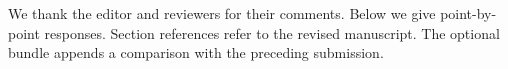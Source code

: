 We thank the editor and reviewers for their comments.
Below we give point-by-point responses. Section references refer to the revised manuscript.
The optional bundle appends a comparison with the preceding submission.

